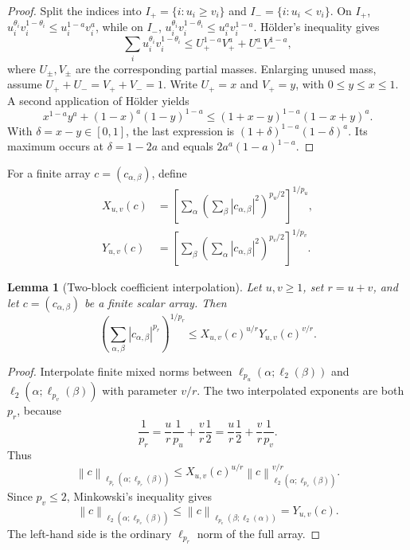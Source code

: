 \documentclass[11pt]{article}
\newtheorem{lemma}[theorem]{Lemma}
\theoremstyle{definition}
\theoremstyle{remark}
\newcommand{\norm}[1]{\left\lVert #1\right\rVert}
\newcommand{\abs}[1]{\left\lvert #1\right\rvert}
\begin{document}
\begin{proof}
Split the indices into $I_+=\{i:u_i\ge v_i\}$ and
$I_-=\{i:u_i<v_i\}$.  On $I_+$,
$u_i^{\theta_i}v_i^{1-\theta_i}\le u_i^{1-a}v_i^a$, while on $I_-$,
$u_i^{\theta_i}v_i^{1-\theta_i}\le u_i^av_i^{1-a}$.  H\"older's inequality
gives
\[
 \sum_i u_i^{\theta_i}v_i^{1-\theta_i}
 \le U_+^{1-a}V_+^a+U_-^aV_-^{1-a},
\]
where $U_\pm,V_\pm$ are the corresponding partial masses.  Enlarging unused
mass, assume $U_++U_-=V_++V_-=1$.  Write $U_+=x$ and $V_+=y$, with
$0\le y\le x\le1$.  A second application of H\"older yields
\[
 x^{1-a}y^a+(1-x)^a(1-y)^{1-a}
 \le(1+x-y)^{1-a}(1-x+y)^a.
\]
With $\delta=x-y\in[0,1]$, the last expression is
$(1+\delta)^{1-a}(1-\delta)^a$.  Its maximum occurs at
$\delta=1-2a$ and equals $2a^a(1-a)^{1-a}$.
\end{proof}

For a finite array $c=(c_{\alpha,\beta})$, define
\begin{align}
 X_{u,v}(c)
 &=\left[
   \sum_\alpha
   \left(\sum_\beta\abs{c_{\alpha,\beta}}^2\right)^{p_u/2}
  \right]^{1/p_u},
 \label{eq:X-def}\\
 Y_{u,v}(c)
 &=\left[
   \sum_\beta
   \left(\sum_\alpha\abs{c_{\alpha,\beta}}^2\right)^{p_v/2}
  \right]^{1/p_v}.
 \label{eq:Y-def}
\end{align}

\begin{lemma}[Two-block coefficient interpolation]
\label{lem:two-block}
Let $u,v\ge1$, set $r=u+v$, and let $c=(c_{\alpha,\beta})$ be a finite
scalar array.  Then
\begin{equation}
\label{eq:two-block}
 \left(\sum_{\alpha,\beta}
       \abs{c_{\alpha,\beta}}^{p_r}\right)^{1/p_r}
 \le X_{u,v}(c)^{u/r}Y_{u,v}(c)^{v/r}.
\end{equation}
\end{lemma}

\begin{proof}
Interpolate finite mixed norms between
$\ell_{p_u}(\alpha;\ell_2(\beta))$ and
$\ell_2(\alpha;\ell_{p_v}(\beta))$ with parameter $v/r$.  The two
interpolated exponents are both $p_r$, because
\[
 \frac1{p_r}
 =\frac ur\frac1{p_u}+\frac vr\frac12
 =\frac ur\frac12+\frac vr\frac1{p_v}.
\]
Thus
\[
 \norm c_{\ell_{p_r}(\alpha;\ell_{p_r}(\beta))}
 \le X_{u,v}(c)^{u/r}
      \norm c_{\ell_2(\alpha;\ell_{p_v}(\beta))}^{v/r}.
\]
Since $p_v\le2$, Minkowski's inequality gives
\[
 \norm c_{\ell_2(\alpha;\ell_{p_v}(\beta))}
 \le\norm c_{\ell_{p_v}(\beta;\ell_2(\alpha))}
 =Y_{u,v}(c).
\]
The left-hand side is the ordinary $\ell_{p_r}$ norm of the full array.
\end{proof}
\end{document}
